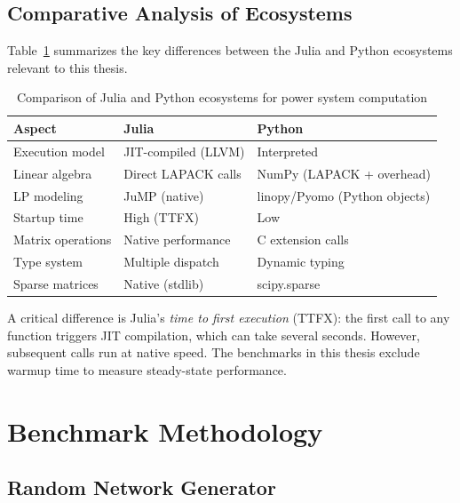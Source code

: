\subsection{Comparative Analysis of Ecosystems}

Table~\ref{tab:ecosystem_comparison} summarizes the key differences between the Julia and Python ecosystems relevant to this thesis.

\begin{table}[H]
\centering
\caption{Comparison of Julia and Python ecosystems for power system computation}
\label{tab:ecosystem_comparison}
\begin{tabular}{lll}
\toprule
\textbf{Aspect} & \textbf{Julia} & \textbf{Python} \\
\midrule
Execution model       & JIT-compiled (LLVM) & Interpreted \\
Linear algebra        & Direct LAPACK calls & NumPy (LAPACK + overhead) \\
LP modeling           & JuMP (native)       & linopy/Pyomo (Python objects) \\
Startup time          & High (TTFX)         & Low \\
Matrix operations     & Native performance  & C extension calls \\
Type system           & Multiple dispatch   & Dynamic typing \\
Sparse matrices       & Native (stdlib)     & scipy.sparse \\
\bottomrule
\end{tabular}
\end{table}

A critical difference is Julia's \emph{time to first execution} (TTFX): the first call to any function triggers JIT compilation, which can take several seconds. However, subsequent calls run at native speed. The benchmarks in this thesis exclude warmup time to measure steady-state performance.

\section{Benchmark Methodology}

\subsection{Random Network Generator}

